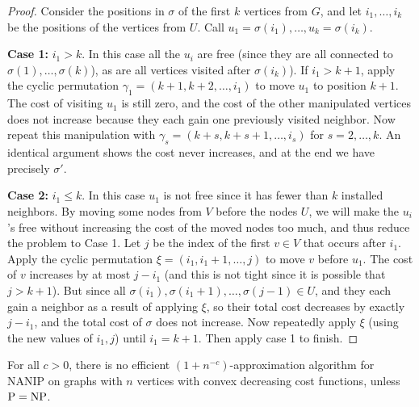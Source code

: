 \begin{proof}
Consider the positions in $\sigma$ of the first $k$ vertices from $G$, and let
$i_1, \dots, i_k$ be the positions of the vertices from $U$. Call $u_1 =
\sigma(i_1), \dots, u_k = \sigma(i_k)$.

\textbf{Case 1:} $i_1 > k$. In this case all the $u_i$ are free
(since they are all connected to $\sigma(1),\ldots,\sigma(k)$), as are all
vertices visited after $\sigma(i_k)$).
If $i_1 > k+1$, apply the cyclic permutation
$\gamma_1 = (k+1, k+2, \dots, i_1)$ to move $u_1$ to position $k+1$. The cost
of visiting $u_1$ is still zero, and the cost of the other manipulated vertices
does not increase because they each gain one previously visited neighbor. Now
repeat this manipulation with $\gamma_s = (k+s, k+s+1, \dots, i_s)$ for $s = 2,
\dots, k$. An identical argument shows the cost never increases, and at the end
we have precisely $\sigma'$. 

\textbf{Case 2:} $i_1 \leq k$. In this case $u_1$ is not free since it has
fewer than $k$ installed neighbors.  By moving some nodes from $V$ before the
nodes $U$, we will make the $u_i$'s free without increasing the cost of the
moved nodes too much, and thus reduce the problem to Case 1.  Let $j$ be the
index of the first $v \in V$ that occurs after $i_1$. Apply the cyclic
permutation $\xi = (i_1, i_1 + 1, \dots, j)$ to move $v$ before $u_1$.  The
cost of $v$ increases by at most $j - i_1$ (and this is not tight since it is
possible that $j > k+1$). But since all $\sigma(i_1), \sigma(i_1 + 1), \dots,
\sigma(j-1) \in U$, and they each gain a neighbor as a result of applying
$\xi$, so their total cost decreases by exactly $j - i_1$, and the total cost
of $\sigma$ does not increase. Now repeatedly apply $\xi$ (using the new values
of $i_1, j$) until $i_1 = k+1$. Then apply case 1 to finish.  

\end{proof}


\begin{theorem}
For all $c>0$, there is no efficient $(1+n^{-c})$-approximation
algorithm for NANIP on graphs with $n$ vertices with convex decreasing cost
functions, unless $\textup{P} = \textup{NP}$.  
\end{theorem}

